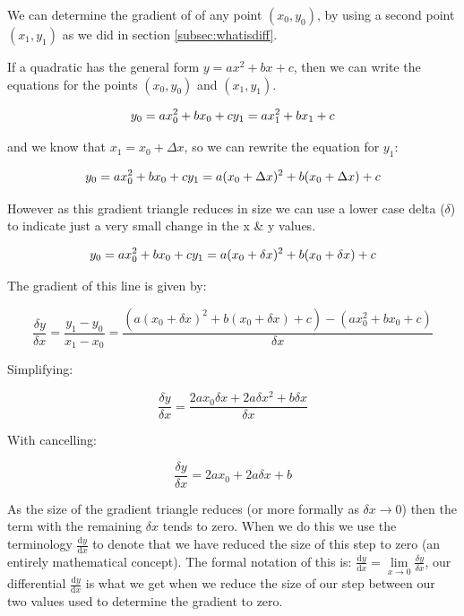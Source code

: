 \documentclass[
]{book}
\begin{document}
We can determine the gradient of of any point \((x_0, y_0)\), by using a second point \((x_1, y_1)\) as we did in section \ref{subsec:whatisdiff}.

If a quadratic has the general form \(y=ax^2+bx+c\), then we can write the equations for the points \((x_0, y_0)\) and \((x_1, y_1)\).

\begin{equation*}
y_0 = ax_0^2+bx_0+c\\
y_1 = ax_1^2+bx_1+c
\end{equation*}

and we know that \(x_1=x_0+\Delta x\), so we can rewrite the equation for \(y_1\):

\begin{equation*}
y_0 = ax_0^2+bx_0+c\\
y_1 = a(x_0+\Delta x)^2+b(x_0+\Delta x)+c
\end{equation*}

However as this gradient triangle reduces in size we can use a lower case delta (\(\delta\)) to indicate just a very small change in the x \& y values.

\begin{equation*}
y_0 = ax_0^2+bx_0+c\\
y_1 = a(x_0+\delta x)^2+b(x_0+\delta x)+c
\end{equation*}

The gradient of this line is given by:

\begin{equation*}
\frac{\delta y}{\delta x} = \frac{y_1-y_0}{x_1-x_0} = \frac{(a(x_0+\delta x)^2+b(x_0+\delta x)+c)-(ax_0^2+bx_0+c)}{\delta x}
\end{equation*}

Simplifying:

\begin{equation*}
\frac{\delta y}{\delta x} = \frac{2ax_0 \delta x +2a \delta x^2+b\delta x}{\delta x}
\end{equation*}

With cancelling:

\begin{equation*}
\frac{\delta y}{\delta x} = 2ax_0+2a \delta x+b
\end{equation*}

As the size of the gradient triangle reduces (or more formally as \(\delta x \rightarrow 0\)) then the term with the remaining \(\delta x\) tends to zero. When we do this we use the terminology \(\frac{\textrm{d}y}{\textrm{d}x}\) to denote that we have reduced the size of this step to zero (an entirely mathematical concept). The formal notation of this is: \(\frac{\textrm{d}y}{\textrm{d}x}=\lim\limits_{x \to 0}\frac{\delta y}{\delta x}\), our differential \(\frac{\textrm{d}y}{\textrm{d}x}\) is what we get when we reduce the size of our step between our two values used to determine the gradient to zero.
\end{document}
